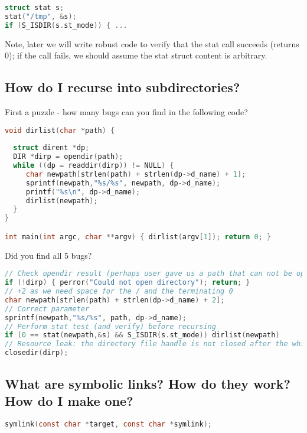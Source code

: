 \begin{lstlisting}[language=C]
struct stat s;
stat("/tmp", &s);
if (S_ISDIR(s.st_mode)) { ... 
\end{lstlisting}

Note, later we will write robust code to verify that the stat call succeeds (returns 0); if the  call fails, we should assume the stat struct content is arbitrary.

\subsection{How do I recurse into subdirectories?}\label{how-do-i-recurse-into-subdirectories}

First a puzzle - how many bugs can you find in the following code?

\begin{lstlisting}[language=C]
void dirlist(char *path) {
  
  struct dirent *dp;
  DIR *dirp = opendir(path);
  while ((dp = readdir(dirp)) != NULL) {
     char newpath[strlen(path) + strlen(dp->d_name) + 1];
     sprintf(newpath,"%s/%s", newpath, dp->d_name);
     printf("%s\n", dp->d_name);
     dirlist(newpath);
  }
}

int main(int argc, char **argv) { dirlist(argv[1]); return 0; }
\end{lstlisting}

Did you find all 5 bugs?

\begin{lstlisting}[language=C]
// Check opendir result (perhaps user gave us a path that can not be opened as a directory
if (!dirp) { perror("Could not open directory"); return; }
// +2 as we need space for the / and the terminating 0
char newpath[strlen(path) + strlen(dp->d_name) + 2]; 
// Correct parameter
sprintf(newpath,"%s/%s", path, dp->d_name); 
// Perform stat test (and verify) before recursing
if (0 == stat(newpath,&s) && S_ISDIR(s.st_mode)) dirlist(newpath)
// Resource leak: the directory file handle is not closed after the while loop
closedir(dirp);
\end{lstlisting}

\subsection{What are symbolic links? How do they work? How do I make one?}\label{what-are-symbolic-links-how-do-they-work-how-do-i-make-one}

\begin{lstlisting}[language=C]
symlink(const char *target, const char *symlink);
\end{lstlisting}

